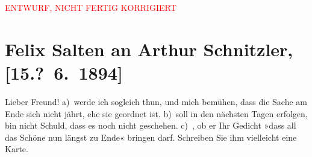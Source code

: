 
\begin{center}
            \textcolor{red}{ENTWURF, NICHT FERTIG KORRIGIERT}
                      \end{center}
            
         
         \renewcommand{\erwaehntePersonen}{Personen: Felix Dörmann}
         \renewcommand{\erwaehnteOrte}{Orte: Café Arkaden, Volkstheater, Wien}
         \renewcommand{\erwaehnteWerke}{Werke: Anfang vom Ende, Therese Krones. Genrebild mit Gesang und Tanz in drei Akten}
               \section[Felix Salten an Arthur Schnitzler, {[}15.? 6. 1894{]}]{ Felix Salten an Arthur Schnitzler, {[}15.? 6. 1894{]}}\nopagebreak{}\rehead{ }\begin{ledgroupsized}[t]{13cm}\normalsize\beginnumbering \toendnotes[C]{\smallbreak\pagebreak[2]} 
\toendnotes[C]{\smallbreak}\pstart
           \noindent{}{\pb}Lieber Freund! a) werde ich sogleich thun, und mich bemühen,
               dass die Sache am Ende sich nicht jährt, ehe sie geordnet ist. \pend
           \pstart
           b) soll in den nächsten Tagen erfolgen, bin nicht Schuld, dass es noch nicht
               geschehen. \pend
           \pstart
           c) \label{K_L03138-11v}\label{K_L03138-11h}, ob er Ihr Gedicht »dass all das Schöne nun längst zu Ende« bringen darf. Schreiben Sie ihm
               vielleicht eine Karte. \pend
           \pstart

\end{ledgroupsized}
